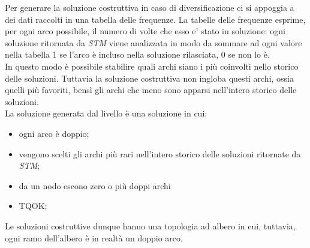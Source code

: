 Per generare la soluzione costruttiva in caso di diversificazione ci si appoggia a dei dati raccolti in una tabella delle frequenze. La tabelle delle
frequenze esprime, per ogni arco possibile, il numero di volte che esso e' stato in soluzione: ogni soluzione ritornata
da \emph{STM} viene analizzata in modo da sommare ad ogni valore nella tabella 1 se l'arco è incluso nella soluzione rilasciata, 0 se non lo è.\\
In questo modo è possibile stabilire quali archi siano i più coinvolti nello storico delle soluzioni. Tuttavia la soluzione costruttiva
non ingloba questi archi, ossia quelli più favoriti, bensì gli archi che meno sono apparsi nell'intero storico delle soluzioni.\\
La soluzione generata dal livello è una soluzione in cui:
\begin{itemize}
	\item ogni arco è doppio;
	\item vengono scelti gli archi più rari nell'intero storico delle soluzioni ritornate da \emph{STM};
	\item da un nodo escono zero o più doppi archi
	\item TQOK;
\end{itemize}

Le soluzioni costruttive dunque hanno una topologia ad albero in cui, tuttavia, ogni ramo dell'albero è in realtà un doppio arco.

